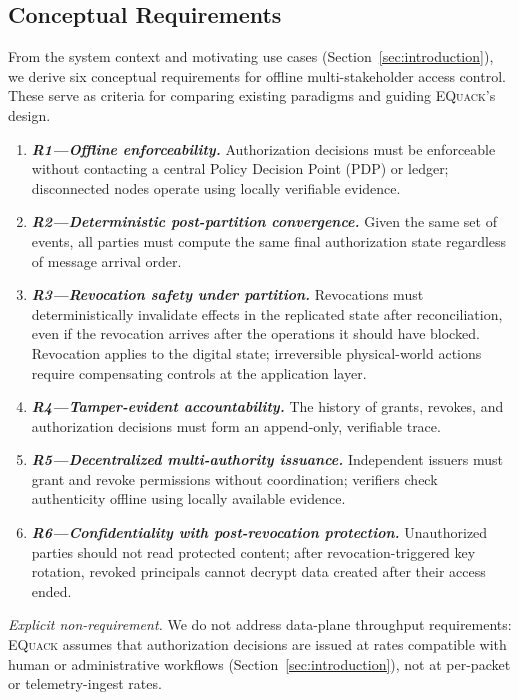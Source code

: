 \documentclass[10pt,journal,compsoc]{IEEEtran}
\newcommand{\equack}{\textsc{EQuack}}
\begin{document}
\subsection{Conceptual Requirements}\label{subsec:conceptual-requirements}

From the system context and motivating use cases (Section~\ref{sec:introduction}), we derive six conceptual requirements for offline multi-stakeholder access control. These serve as criteria for comparing existing paradigms and guiding \equack{}'s design.

\begin{enumerate}
    \item \textbf{\textit{R1---Offline enforceability.}} Authorization decisions must be enforceable without contacting a central Policy Decision Point (PDP) or ledger; disconnected nodes operate using locally verifiable evidence.
    \item \textbf{\textit{R2---Deterministic post-partition convergence.}} Given the same set of events, all parties must compute the same final authorization state regardless of message arrival order.
    \item \textbf{\textit{R3---Revocation safety under partition.}} Revocations must deterministically invalidate effects in the replicated state after reconciliation, even if the revocation arrives after the operations it should have blocked. Revocation applies to the digital state; irreversible physical-world actions require compensating controls at the application layer.
    \item \textbf{\textit{R4---Tamper-evident accountability.}} The history of grants, revokes, and authorization decisions must form an append-only, verifiable trace.
    \item \textbf{\textit{R5---Decentralized multi-authority issuance.}} Independent issuers must grant and revoke permissions without coordination; verifiers check authenticity offline using locally available evidence.
    \item \textbf{\textit{R6---Confidentiality with post-revocation protection.}} Unauthorized parties should not read protected content; after revocation-triggered key rotation, revoked principals cannot decrypt data created after their access ended.
\end{enumerate}

\noindent\textit{Explicit non-requirement.} We do not address data-plane throughput requirements: \equack{} assumes that authorization decisions are issued at rates compatible with human or administrative workflows (Section~\ref{sec:introduction}), not at per-packet or telemetry-ingest rates.
\end{document}
